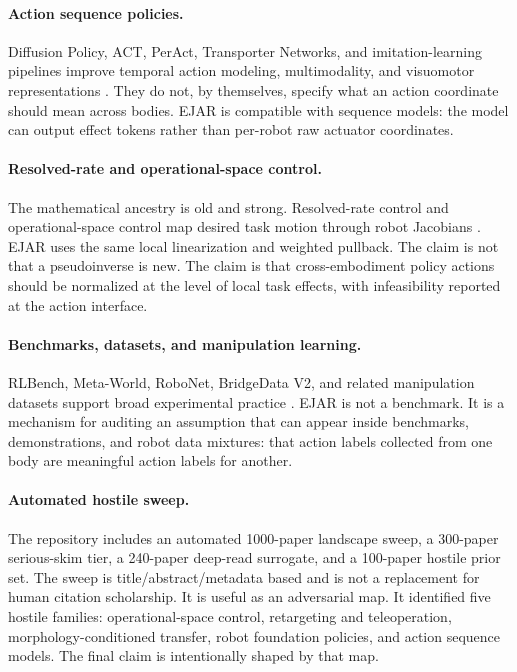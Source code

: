 \documentclass{article}
\begin{document}
\paragraph{Action sequence policies.}
Diffusion Policy, ACT, PerAct, Transporter Networks, and imitation-learning pipelines improve temporal action modeling, multimodality, and visuomotor representations \citep{chi2023diffusion,zhao2023act,shridhar2023peract,florence2020transporter,mandlekar2021robomimic}. They do not, by themselves, specify what an action coordinate should mean across bodies. EJAR is compatible with sequence models: the model can output effect tokens rather than per-robot raw actuator coordinates.

\paragraph{Resolved-rate and operational-space control.}
The mathematical ancestry is old and strong. Resolved-rate control and operational-space control map desired task motion through robot Jacobians \citep{whitney1969resolved,khatib1987operational}. EJAR uses the same local linearization and weighted pullback. The claim is not that a pseudoinverse is new. The claim is that cross-embodiment policy actions should be normalized at the level of local task effects, with infeasibility reported at the action interface.

\paragraph{Benchmarks, datasets, and manipulation learning.}
RLBench, Meta-World, RoboNet, BridgeData V2, and related manipulation datasets support broad experimental practice \citep{james2020rlbench,yu2020meta,dasari2019robonet,walke2023bridgedata}. EJAR is not a benchmark. It is a mechanism for auditing an assumption that can appear inside benchmarks, demonstrations, and robot data mixtures: that action labels collected from one body are meaningful action labels for another.

\paragraph{Automated hostile sweep.}
The repository includes an automated 1000-paper landscape sweep, a 300-paper serious-skim tier, a 240-paper deep-read surrogate, and a 100-paper hostile prior set. The sweep is title/abstract/metadata based and is not a replacement for human citation scholarship. It is useful as an adversarial map. It identified five hostile families: operational-space control, retargeting and teleoperation, morphology-conditioned transfer, robot foundation policies, and action sequence models. The final claim is intentionally shaped by that map.
\end{document}
